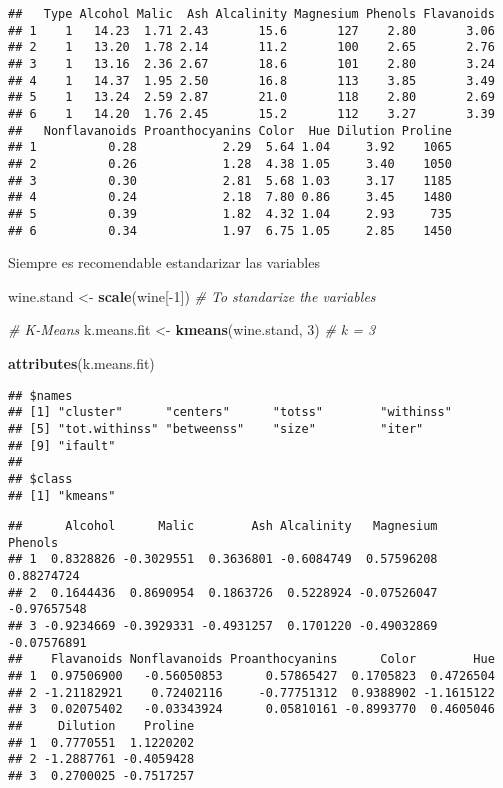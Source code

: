 \documentclass[]{article}
\newenvironment{Shaded}{\begin{snugshade}}{\end{snugshade}}
\newcommand{\KeywordTok}[1]{\textcolor[rgb]{0.13,0.29,0.53}{\textbf{{#1}}}}
\newcommand{\DecValTok}[1]{\textcolor[rgb]{0.00,0.00,0.81}{{#1}}}
\newcommand{\StringTok}[1]{\textcolor[rgb]{0.31,0.60,0.02}{{#1}}}
\newcommand{\CommentTok}[1]{\textcolor[rgb]{0.56,0.35,0.01}{\textit{{#1}}}}
\newcommand{\NormalTok}[1]{{#1}}
\numberwithin{equation}{section}
\begin{document}
\begin{verbatim}
##   Type Alcohol Malic  Ash Alcalinity Magnesium Phenols Flavanoids
## 1    1   14.23  1.71 2.43       15.6       127    2.80       3.06
## 2    1   13.20  1.78 2.14       11.2       100    2.65       2.76
## 3    1   13.16  2.36 2.67       18.6       101    2.80       3.24
## 4    1   14.37  1.95 2.50       16.8       113    3.85       3.49
## 5    1   13.24  2.59 2.87       21.0       118    2.80       2.69
## 6    1   14.20  1.76 2.45       15.2       112    3.27       3.39
##   Nonflavanoids Proanthocyanins Color  Hue Dilution Proline
## 1          0.28            2.29  5.64 1.04     3.92    1065
## 2          0.26            1.28  4.38 1.05     3.40    1050
## 3          0.30            2.81  5.68 1.03     3.17    1185
## 4          0.24            2.18  7.80 0.86     3.45    1480
## 5          0.39            1.82  4.32 1.04     2.93     735
## 6          0.34            1.97  6.75 1.05     2.85    1450
\end{verbatim}

Siempre es recomendable estandarizar las variables

\begin{Shaded}
\begin{Highlighting}[]
\NormalTok{wine.stand <-}\StringTok{ }\KeywordTok{scale}\NormalTok{(wine[-}\DecValTok{1}\NormalTok{])  }\CommentTok{# To standarize the variables}

\CommentTok{# K-Means}
\NormalTok{k.means.fit <-}\StringTok{ }\KeywordTok{kmeans}\NormalTok{(wine.stand, }\DecValTok{3}\NormalTok{) }\CommentTok{# k = 3}
\end{Highlighting}
\end{Shaded}

\begin{Shaded}
\begin{Highlighting}[]
\KeywordTok{attributes}\NormalTok{(k.means.fit)}
\end{Highlighting}
\end{Shaded}

\begin{verbatim}
## $names
## [1] "cluster"      "centers"      "totss"        "withinss"    
## [5] "tot.withinss" "betweenss"    "size"         "iter"        
## [9] "ifault"      
## 
## $class
## [1] "kmeans"
\end{verbatim}

\begin{verbatim}
##      Alcohol      Malic        Ash Alcalinity   Magnesium     Phenols
## 1  0.8328826 -0.3029551  0.3636801 -0.6084749  0.57596208  0.88274724
## 2  0.1644436  0.8690954  0.1863726  0.5228924 -0.07526047 -0.97657548
## 3 -0.9234669 -0.3929331 -0.4931257  0.1701220 -0.49032869 -0.07576891
##    Flavanoids Nonflavanoids Proanthocyanins      Color        Hue
## 1  0.97506900   -0.56050853      0.57865427  0.1705823  0.4726504
## 2 -1.21182921    0.72402116     -0.77751312  0.9388902 -1.1615122
## 3  0.02075402   -0.03343924      0.05810161 -0.8993770  0.4605046
##     Dilution    Proline
## 1  0.7770551  1.1220202
## 2 -1.2887761 -0.4059428
## 3  0.2700025 -0.7517257
\end{verbatim}
\end{document}
